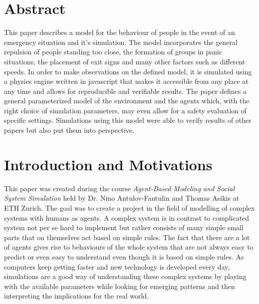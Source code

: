 \documentclass[11pt]{article}
\begin{document}






\tableofcontents

\newpage




\section{Abstract}

This paper describes a model for the behaviour of people in the event of an emergency situation and it's simulation. The model incorporates the general repulsion of people standing too close, the formation of groups in panic situations, the placement of exit signs and many other factors such as different speeds. In order to make observations on the defined model, it is simulated using a physics engine written in javascript that makes it accessible from any place at any time and allows for reproducible and verifiable results. The paper defines a general parameterized model of the environment and the agents which, with the right choice of simulation parameters, may even allow for a safety evaluation of specific settings. Simulations using this model were able to verify results of other papers but also put them into perspective.

\section{Introduction and Motivations}

This paper was created during the course \textit{Agent-Based Modeling and Social System Simulation} held by Dr. Nino Antulov-Fantulin and Thomas Asikis at ETH Zurich. The goal was to create a project in the field of modelling of complex systems with humans as agents. A complex system is in contrast to complicated system not per se hard to implement but rather consists of many simple small parts that on themselves act based on simple rules. The fact that there are a lot of agents gives rise to behaviours of the whole system that are not always easy to predict or even easy to understand even though it is based on simple rules. As computers keep getting faster and new technology is developed every day, simulations are a good way of understanding these complex systems by playing with the available parameters while looking for emerging patterns and then interpreting the implications for the real world.
\end{document}
